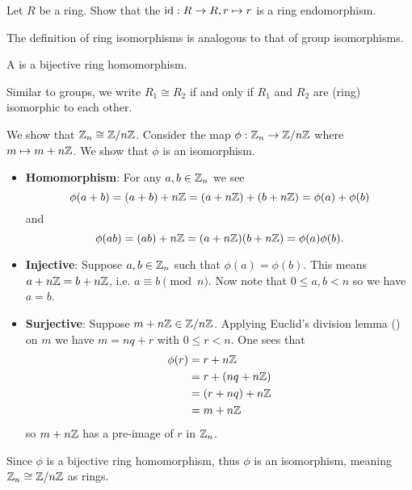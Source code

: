 \begin{exercise}
    Let $R$ be a ring. Show that the  $\mathrm{id}: R \to R, r \mapsto r$ is a ring endomorphism.
\end{exercise}

The definition of ring isomorphisms is analogous to that of group isomorphisms.

\begin{definition}
    A  is a bijective ring homomorphism.
\end{definition}

Similar to groups, we write $R_1 \cong R_2$ if and only if $R_1$ and $R_2$ are (ring) isomorphic to each other.

\begin{example}\label{example-Zn-ring-isomorphic-to-Z/nZ}
    We show that $\mathbb{Z}_n \cong \mathbb{Z}/n\mathbb{Z}$. Consider the map $\phi:\mathbb{Z}_n \to \mathbb{Z}/n\mathbb{Z}$ where $m \mapsto m + n\mathbb{Z}$. We show that $\phi$ is an isomorphism.
    \begin{itemize}
        \item \textbf{Homomorphism}: For any $a, b \in \mathbb{Z}_n$ we see
        \[
            \phi(a+b) = (a+b) + n\mathbb{Z} = (a + n\mathbb{Z}) + (b + n\mathbb{Z}) = \phi(a) + \phi(b)
        \]
        and
        \[
            \phi(ab) = (ab) + n\mathbb{Z} = (a+n\mathbb{Z})(b+n\mathbb{Z}) = \phi(a)\phi(b).
        \]

        \item \textbf{Injective}: Suppose $a, b \in \mathbb{Z}_n$ such that $\phi(a) = \phi(b)$. This means $a + n\mathbb{Z} = b + n\mathbb{Z}$, i.e. $a \equiv b \pmod n$. Now note that $0 \leq a,b < n$ so we have $a = b$.

        \item \textbf{Surjective}: Suppose $m + n\mathbb{Z} \in \mathbb{Z}/n\mathbb{Z}$. Applying Euclid's division lemma () on $m$ we have $m = nq + r$ with $0 \leq r < n$. One sees that
        \begin{align*}
            \phi(r) &= r + n\mathbb{Z}\\
            &= r + (nq + n\mathbb{Z})\\
            &= (r + nq) + n\mathbb{Z}\\
            &= m + n\mathbb{Z}
        \end{align*}
        so $m + n\mathbb{Z}$ has a pre-image of $r$ in $\mathbb{Z}_n$.
    \end{itemize}
    Since $\phi$ is a bijective ring homomorphism, thus $\phi$ is an isomorphism, meaning $\mathbb{Z}_n \cong \mathbb{Z}/n\mathbb{Z}$ as rings.
\end{example}
